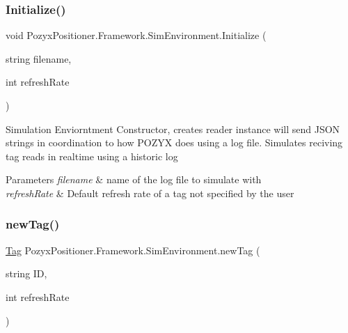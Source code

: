\subsubsection{\texorpdfstring{Initialize()}{Initialize()}\hspace{0.1cm}{\footnotesize\ttfamily [3/3]}}
{\footnotesize\ttfamily void Pozyx\+Positioner.\+Framework.\+Sim\+Environment.\+Initialize (\begin{DoxyParamCaption}\item[{string}]{filename,  }\item[{int}]{refresh\+Rate }\end{DoxyParamCaption})}



Simulation Enviorntment Constructor, creates reader instance will send J\+S\+ON strings in coordination to how P\+O\+Z\+YX does using a log file. Simulates reciving tag reads in realtime using a historic log 


\begin{DoxyParams}{Parameters}
{\em filename} & name of the log file to simulate with\\
\hline
{\em refresh\+Rate} & Default refresh rate of a tag not specified by the user\\
\hline
\end{DoxyParams}
\mbox{\label{class_pozyx_positioner_1_1_framework_1_1_sim_environment_ad523ae9a258ae7b68d7f966be92ff3bb}} 
\subsubsection{\texorpdfstring{new\+Tag()}{newTag()}\hspace{0.1cm}{\footnotesize\ttfamily [1/2]}}
{\footnotesize\ttfamily \hyperlink{class_pozyx_positioner_1_1_framework_1_1_tag}{Tag} Pozyx\+Positioner.\+Framework.\+Sim\+Environment.\+new\+Tag (\begin{DoxyParamCaption}\item[{string}]{ID,  }\item[{int}]{refresh\+Rate }\end{DoxyParamCaption})}



